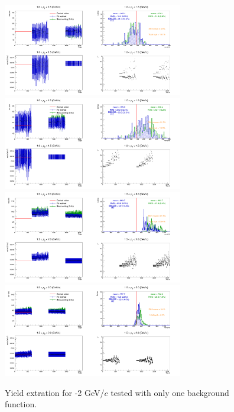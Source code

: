 \begin{figure}[!h]
\begin{center}
\includegraphics[width=0.7\textwidth]{figures/Dstar/pp13TeV/multi_trial/multi_bin_bkg4alt_1-1dot5GeV.png}
\includegraphics[width=0.7\textwidth]{figures/Dstar/pp13TeV/multi_trial/multi_bin_bkg4std_1-1dot5GeV.png}
\includegraphics[width=0.7\textwidth]{figures/Dstar/pp13TeV/multi_trial/multi_bin_bkg5alt_1dot5-2GeV.png}
\includegraphics[width=0.7\textwidth]{figures/Dstar/pp13TeV/multi_trial/multi_bin_bkg5std_1dot5-2GeV.png}
\caption{Yield extration for -2 GeV/$c$ tested with only one background function.}
\label{fig:DstarYieldSyst010_33}
\end{center}
\end{figure}



